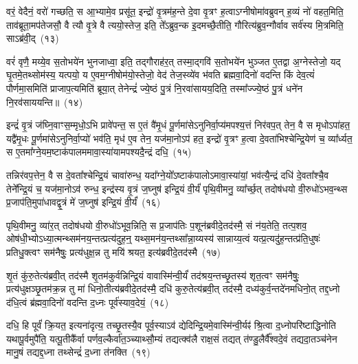 वरं॒ वेदैनं॒ वरो॑ गच्छति॒ स आ॒भ्यामे॒व प्रसू॑त॒ इन्द्रो॑ वृ॒त्रम॑ह॒न्ते दे॒वा वृ॒त्रꣳ ह॒त्वा\-ऽग्नी\-षोमा॑वब्रुवन् ह॒व्यं नो॑ वहत॒मिति॒ ताव॑ब्रूता॒मप॑तेजसौ॒ वै त्यौ वृ॒त्रे वै त्ययो॒स्तेज॒ इति॒ ते᳚\-ऽब्रुव॒न्क इ॒दमच्छै॒तीति॒ गौरित्य॑ब्रुव॒न्गौर्वाव सर्व॑स्य मि॒त्रमिति॒ सा\-ऽब्र॑वी॒द्~(१३)

वरं॑ वृणै॒ मय्ये॒व स॒तोभये॑न भुनजाध्वा॒ इति॒ तद्गौराह॑र॒त् तस्मा॒द्गवि॑ स॒तोभये॑न भुञ्जत ए॒तद्वा अ॒ग्नेस्तेजो॒ यद् घृ॒तमे॒तथ्सोम॑स्य॒ यत्पयो॒ य ए॒वम॒ग्नी\-षोम॑यो॒स्तेजो॒ वेद॑ तेज॒स्व्ये॑व भ॑वति ब्रह्मवा॒दिनो॑ वदन्ति किं देव॒त्यं॑ पौर्णमा॒समिति॑ प्राजाप॒त्यमिति॑ ब्रूया॒त् तेनेन्द्रं॑ ज्ये॒ष्ठं पु॒त्रं नि॒रवा॑सायय॒दिति॒ तस्मा᳚ज्ज्ये॒ष्ठं पु॒त्रं धने॑न नि॒रव॑साययन्ति॥~(१४)

{\anuvakamend[{अ॒स्य॒ मा वेदा द्यावा॑पृथि॒व्योर॑ब्रवी॒दिति॒ तस्मा᳚च्च॒त्वारि॑ च}]}%

इन्द्रं॑ वृ॒त्रं ज॑घ्नि॒वाꣳस॒म्मृधो॒\-ऽभि प्रावे॑पन्त॒ स ए॒तं वै॑मृ॒धं पू॒र्णमा॑से\-ऽनुनिर्वा॒प्य॑मपश्य॒त्तं निर॑वप॒त् तेन॒ वै स मृधो\-ऽपा॑हत॒ यद्वै॑मृ॒धः पू॒र्णमा॑से\-ऽनुनिर्वा॒प्यो॑ भव॑ति॒ मृध॑ ए॒व तेन॒ यज॑मा॒नो\-ऽप॑ हत॒ इन्द्रो॑ वृ॒त्रꣳ ह॒त्वा दे॒वता॑भिश्चेन्द्रि॒येण॑ च॒ व्या᳚र्ध्यत॒ स ए॒तमा᳚ग्ने॒यम॒ष्टाक॑पालममावा॒स्या॑यामपश्यदै॒न्द्रं दधि॒~(१५)

तन्निर॑वप॒त्तेन॒ वै स दे॒वता᳚श्चेन्द्रि॒यं चावा॑रुन्ध॒ यदा᳚ग्ने॒यो᳚\-ऽष्टाक॑पालो\-ऽमावा॒स्या॑यां॒ भव॑त्यै॒न्द्रं दधि॑ दे॒वता᳚श्चै॒व तेने᳚न्द्रि॒यं च॒ यज॑मा॒नो\-ऽव॑ रुन्ध॒ इन्द्र॑स्य वृ॒त्रं ज॒घ्नुष॑ इन्द्रि॒यं वी॒र्यं॑ पृथि॒वीमनु॒ व्या᳚र्च्छ॒त् तदोष॑धयो वी॒रुधो॑\-ऽभव॒न्थ्स प्र॒जा\-प॑ति॒मुपा॑धावद्वृ॒त्रं मे॑ ज॒घ्नुष॑ इन्द्रि॒यं वी॒र्यं॑~(१६)

पृथि॒वीमनु॒ व्या॑र॒त् तदोष॑धयो वी॒रुधो॑\-ऽभूव॒न्निति॒ स प्र॒जा\-प॑तिः प॒शून॑ब्रवीदे॒तद॑स्मै॒ सं न॑य॒तेति॒ तत्प॒शव॒ ओष॑धी॒भ्यो\-ऽध्या॒त्मन्थ्सम॑नय॒न्तत्प्रत्य॑दुह॒न्॒ यथ्स॒मन॑य॒न्तथ्सा᳚न्ना॒य्यस्य॑ सान्नाय्य॒त्वं यत्प्र॒त्यदु॑ह॒न्तत्प्र॑ति॒धुषः॑ प्रतिधु॒क्त्वꣳ सम॑नैषुः॒ प्रत्य॑धुक्ष॒न्न तु मयि॑ श्रयत॒ इत्य॑ब्रवीदे॒तद॑स्मै~(१७)

शृ॒तं कु॑रु॒तेत्य॑ब्रवी॒त् तद॑स्मै शृ॒तम॑कुर्वन्निन्द्रि॒यं वावास्मि॑न्वी॒र्यं॑ तद॑श्रय॒न्तच्छृ॒तस्य॑ शृत॒त्वꣳ सम॑नैषुः॒ प्रत्य॑धुक्षञ्छृ॒तम॑क्र॒न्न तु मा॑ धिनो॒तीत्य॑ब्रवीदे॒तद॑स्मै॒ दधि॑ कुरु॒तेत्य॑ब्रवी॒त् तद॑स्मै॒ दध्य॑कुर्व॒न्तदे॑नमधिनो॒त् तद्द॒ध्नो द॑धि॒त्वं ब्र॑ह्मवा॒दिनो॑ वदन्ति द॒ध्नः पूर्व॑स्याव॒देयं॒~(१८)

दधि॒ हि पूर्वं॑ क्रि॒यत॒ इत्यना॑दृत्य॒ तच्छृ॒तस्यै॒व पूर्व॒स्याऽव॑ द्येदिन्द्रि॒यमे॒वास्मि॑न्वी॒र्यꣴ॑ श्रि॒त्वा द॒ध्नोपरि॑ष्टाद्धिनोति यथापू॒र्वमुपै॑ति॒ यत्पू॒तीकै᳚र्वा पर्णव॒ल्कैर्वा॑त॒ञ्च्याथ्सौ॒म्यं तद्यत्क्व॑लै राक्ष॒सं तद्यत् त॑ण्डु॒लैर्वै᳚श्वदे॒वं तद्यदा॒तञ्च॑नेन मानु॒षं तद्यद्द॒ध्ना तथ्सेन्द्रं॑ द॒ध्ना त॑नक्ति~(१९)

